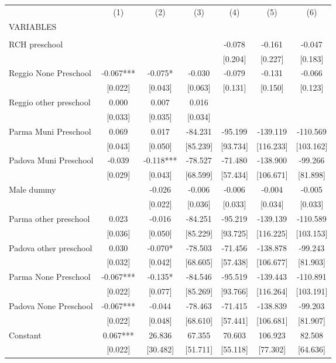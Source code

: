 \begin{tabular}{lcccccc} \hline
 & (1) & (2) & (3) & (4) & (5) & (6) \\
VARIABLES &  &  &  &  &  &  \\ \hline
 &  &  &  &  &  &  \\
RCH preschool &  &  &  & -0.078 & -0.161 & -0.047 \\
 &  &  &  & [0.204] & [0.227] & [0.183] \\
Reggio None Preschool & -0.067*** & -0.075* & -0.030 & -0.079 & -0.131 & -0.066 \\
 & [0.022] & [0.043] & [0.063] & [0.131] & [0.150] & [0.123] \\
Reggio other preschool & 0.000 & 0.007 & 0.016 &  &  &  \\
 & [0.033] & [0.035] & [0.034] &  &  &  \\
Parma Muni Preschool & 0.069 & 0.017 & -84.231 & -95.199 & -139.119 & -110.569 \\
 & [0.043] & [0.050] & [85.239] & [93.734] & [116.233] & [103.162] \\
Padova Muni Preschool & -0.039 & -0.118*** & -78.527 & -71.480 & -138.900 & -99.266 \\
 & [0.029] & [0.043] & [68.599] & [57.434] & [106.671] & [81.898] \\
Male dummy &  & -0.026 & -0.006 & -0.006 & -0.004 & -0.005 \\
 &  & [0.022] & [0.036] & [0.033] & [0.034] & [0.033] \\
Parma other preschool & 0.023 & -0.016 & -84.251 & -95.219 & -139.139 & -110.589 \\
 & [0.036] & [0.050] & [85.229] & [93.725] & [116.225] & [103.153] \\
Padova other preschool & 0.030 & -0.070* & -78.503 & -71.456 & -138.878 & -99.243 \\
 & [0.032] & [0.042] & [68.605] & [57.438] & [106.677] & [81.903] \\
Parma None Preschool & -0.067*** & -0.135* & -84.546 & -95.519 & -139.443 & -110.891 \\
 & [0.022] & [0.077] & [85.269] & [93.766] & [116.264] & [103.191] \\
Padova None Preschool & -0.067*** & -0.044 & -78.463 & -71.415 & -138.839 & -99.203 \\
 & [0.022] & [0.048] & [68.610] & [57.441] & [106.681] & [81.907] \\
Constant & 0.067*** & 26.836 & 67.355 & 70.603 & 106.923 & 82.508 \\
 & [0.022] & [30.482] & [51.711] & [55.118] & [77.302] & [64.636] \\

\end{tabular}
